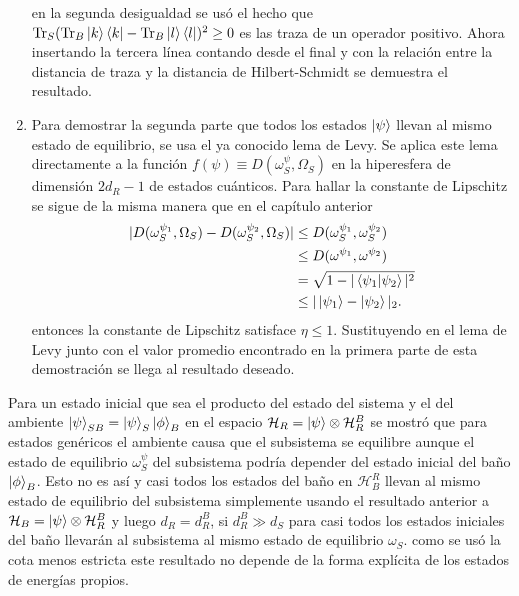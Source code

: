 \begin{enumerate}
en la segunda desigualdad se usó el hecho que $\Tr_{S} (\Tr_{B} \ket{k}\bra{k}-\Tr_{B} \ket{l}\bra{l})^{2}\geq 0$ es las traza de un operador positivo. Ahora insertando la tercera línea contando desde el final y con la relación entre la distancia de traza y la distancia de Hilbert-Schmidt se demuestra el resultado.
\item Para demostrar la segunda parte que todos los estados $\ket{\psi}$ llevan al mismo estado de equilibrio, se usa el ya conocido lema de Levy. Se aplica este lema directamente a la función $f(\psi) \equiv D(\omega_{S}^{\psi}, \Omega_{S})$ en la hiperesfera de dimensión $2d_{R}-1$ de estados cuánticos. Para hallar la constante de Lipschitz se sigue de la misma manera que en el capítulo anterior
\begin{align*}
|D(\omega_{S}^{\psi_{1}}, \Omega_{S})-D(\omega_{S}^{\psi_{2}},\Omega_{S})| &\leq D(\omega_{S}^{\psi_{1}},\omega_{S}^{\psi_{2}})
\\
&\leq D(\omega^{\psi_{1}},\omega^{\psi_{2}})
\\
&= \sqrt{1- |\bra{\psi_{1}} \ket{\psi_{2}}|^{2}}
\\
&\leq |\ket{\psi_{1}} - \ket{\psi_{2}}|_{2}.
\end{align*} 
entonces la constante de Lipschitz satisface $\eta \leq 1$. Sustituyendo en el lema de Levy junto con el valor promedio encontrado en la primera parte de esta demostración se llega al resultado deseado.
\\
\end{enumerate}

Para un estado inicial que sea el producto del estado del sistema y el del ambiente $\ket{\psi}_{SB}= \ket{\psi}_{S} \ket{\phi}_{B}$ en el espacio $\mathcal{H}_{R}=\ket{\psi} \otimes \mathcal{H}_{R}^{B}$ se mostró que para estados genéricos el ambiente causa que el subsistema se equilibre aunque el estado de equilibrio $\omega_{S}^{\psi}$ del subsistema podría  depender del estado inicial del baño $\ket{\phi}_{B}$. Esto no es así y casi todos los estados del baño en $\mathcal{H}_{B}^{R}$ llevan al mismo estado de equilibrio del subsistema simplemente usando el resultado anterior a  $\mathcal{H}_{B} = \ket{\psi}\otimes \mathcal{H}_{R}^{B}$ y luego $d_{R} = d_{R}^{B}$, si $d_{R}^{B} \gg d_{S}$ para casi todos los estados iniciales del baño llevarán al subsistema al mismo estado de equilibrio $\omega_{S}$. como se usó la cota menos estricta este resultado no depende de la forma explícita de los estados de energías propios.
\\


